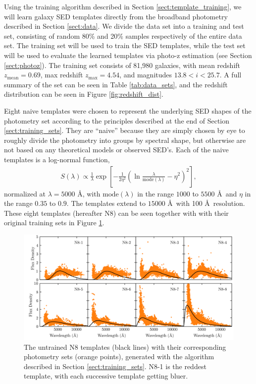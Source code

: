 
\label{sect:application}

Using the training algorithm described in Section \ref{sect:template_training}, we will learn galaxy SED templates directly from the broadband photometry described in Section \ref{sect:data}.
We divide the data set into a training and test set, consisting of random 80\% and 20\% samples respectively of the entire data set.
The training set will be used to train the SED templates, while the test set will be used to evaluate the learned templates via photo-z estimation (see Section \ref{sect:photoz}).
The training set consists of 81,980 galaxies, with mean redshift $z_\text{mean} = 0.69$, max redshift $z_\text{max} = 4.54$, and magnitudes $13.8 < i < 25.7$.
A full summary of the set can be seen in Table \ref{tab:data_sets}, and the redshift distribution can be seen in Figure \ref{fig:redshift_dist}.

Eight naive templates were chosen to represent the underlying SED shapes of the photometry set according to the principles described at the end of Section \ref{sect:training_sets}.
They are ``naive'' because they are simply chosen by eye to roughly divide the photometry into groups by spectral shape, but otherwise are not based on any theoretical models or observed SED's.
Each of the naive templates is a log-normal function,
\begin{align}
    S(\lambda) \propto \frac{1}{\lambda} \exp{\left[ -\frac{1}{2\eta^2} \left( \ln{\frac{\lambda}{\text{mode}(\lambda)}}-\eta^2 \right)^2 \right]},
\end{align}
normalized at $\lambda = 5000$ \AA, with $\text{mode}(\lambda)$ in the range $1000$ to $5500$ \AA\  and $\eta$ in the range $0.35$ to $0.9$. 
The templates extend to $15000$ \AA\ with 100 \AA\ resolution.
These eight templates (hereafter N8) can be seen together with with their original training sets in Figure \ref{fig:N8_untrained}.

\begin{figure}
    \centering
    \includegraphics{figures/N8_untrained.png}
    \caption{The untrained N8 templates (black lines) with their corresponding photometry sets (orange points), generated with the algorithm described in Section \ref{sect:training_sets}. N8-1 is the reddest template, with each successive template getting bluer.}
    \label{fig:N8_untrained}
\end{figure}

